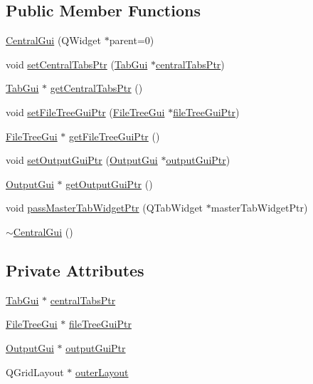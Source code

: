\subsection*{Public Member Functions}
\begin{DoxyCompactItemize}
\item 
\hyperlink{class_central_gui_aba31873e4b5d4bf9fd1e563601efc4e7}{Central\-Gui} (Q\-Widget $\ast$parent=0)
\item 
void \hyperlink{class_central_gui_afb70afe6db1411c77956236188e67bd0}{set\-Central\-Tabs\-Ptr} (\hyperlink{class_tab_gui}{Tab\-Gui} $\ast$\hyperlink{class_central_gui_a8ec49e2c3a7c601bed4a7e4ccf173682}{central\-Tabs\-Ptr})
\item 
\hyperlink{class_tab_gui}{Tab\-Gui} $\ast$ \hyperlink{class_central_gui_a16716c4c66f7ce8e4552fcb20337ab39}{get\-Central\-Tabs\-Ptr} ()
\item 
void \hyperlink{class_central_gui_a65abd3c9dc8bb14a60ca89da399c427e}{set\-File\-Tree\-Gui\-Ptr} (\hyperlink{class_file_tree_gui}{File\-Tree\-Gui} $\ast$\hyperlink{class_central_gui_a6abfae93daa17e3af2a814888c9c14cf}{file\-Tree\-Gui\-Ptr})
\item 
\hyperlink{class_file_tree_gui}{File\-Tree\-Gui} $\ast$ \hyperlink{class_central_gui_aba7129fa7a935565409beb63498c2eb3}{get\-File\-Tree\-Gui\-Ptr} ()
\item 
void \hyperlink{class_central_gui_ae8559c5a3733e33a1ded21db79bd8d3a}{set\-Output\-Gui\-Ptr} (\hyperlink{class_output_gui}{Output\-Gui} $\ast$\hyperlink{class_central_gui_a60c563767906a6db0c209f0b21437a09}{output\-Gui\-Ptr})
\item 
\hyperlink{class_output_gui}{Output\-Gui} $\ast$ \hyperlink{class_central_gui_a47d2d46581f064ed8b46e1f611a0bd98}{get\-Output\-Gui\-Ptr} ()
\item 
void \hyperlink{class_central_gui_a8f7149e1e5b7cfc5c694421482c68c5e}{pass\-Master\-Tab\-Widget\-Ptr} (Q\-Tab\-Widget $\ast$master\-Tab\-Widget\-Ptr)
\item 
\hyperlink{class_central_gui_ad54c2077e29d7a2017399b39e62c1043}{$\sim$\-Central\-Gui} ()
\end{DoxyCompactItemize}
\subsection*{Private Attributes}
\begin{DoxyCompactItemize}
\item 
\hyperlink{class_tab_gui}{Tab\-Gui} $\ast$ \hyperlink{class_central_gui_a8ec49e2c3a7c601bed4a7e4ccf173682}{central\-Tabs\-Ptr}
\item 
\hyperlink{class_file_tree_gui}{File\-Tree\-Gui} $\ast$ \hyperlink{class_central_gui_a6abfae93daa17e3af2a814888c9c14cf}{file\-Tree\-Gui\-Ptr}
\item 
\hyperlink{class_output_gui}{Output\-Gui} $\ast$ \hyperlink{class_central_gui_a60c563767906a6db0c209f0b21437a09}{output\-Gui\-Ptr}
\item 
Q\-Grid\-Layout $\ast$ \hyperlink{class_central_gui_ab10e8028968ca8d5bf7b2cfe4b257d52}{outer\-Layout}
\end{DoxyCompactItemize}



